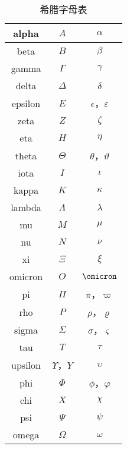 \begin{issues}
\issueDraft
\end{issues}

\begin{table}[ht]
\centering
\caption{希腊字母表}\label{tab_GreekL1}
\begin{tabular}{|c|c|c|}
\hline
alpha&${A}$&$\alpha$\\
\hline
beta&${B}$&$\beta$\\
\hline
gamma&$\Gamma$&$\gamma$\\
\hline
delta&$\Delta$&$\delta$\\
\hline
epsilon&${E}$&$\epsilon$，$\varepsilon$\\
\hline
zeta&${Z}$&$\zeta$\\
\hline
eta&${H}$&$\eta$\\
\hline
theta&$\Theta$&$\theta$，$\vartheta$\\
\hline
iota&${I}$&$\iota$\\
\hline
kappa&${K}$&$\kappa$\\
\hline
lambda&$\Lambda$&$\lambda$\\
\hline
mu&${M}$&$\mu$\\
\hline
nu&${N}$&$\nu$\\
\hline
xi&$\Xi$&$\xi$\\
\hline
omicron&${O}$&$\omicron$\\
\hline
pi&$\Pi$&$\pi$，$\varpi$\\
\hline
rho&$P$&$\rho$，$\varrho$\\
\hline
sigma&$\Sigma$&$\sigma$，$\varsigma$\\
\hline
tau&$T$&$\tau$\\
\hline
upsilon&$\Upsilon$，$Y$&$\upsilon$\\
\hline
phi&$\Phi$&$\phi$，$\varphi$\\
\hline
chi&$X$&$\chi$\\
\hline
psi&$\Psi$&$\psi$\\
\hline
omega&$\Omega$&$\omega$\\
\hline
\end{tabular}
\end{table}
